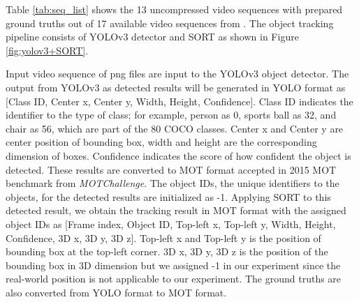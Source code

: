 Table \ref{tab:seq_list} shows the 13 uncompressed video sequences with prepared ground truths out of 17 available video sequences from \cite{choi_vcm_2020}. The object tracking pipeline consists of YOLOv3 detector and SORT as shown in Figure \ref{fig:yolov3+SORT}. 

Input video sequence of png files are input to the YOLOv3 object detector. The output from YOLOv3 as detected results will be generated in YOLO format as [Class ID, Center x, Center y, Width, Height, Confidence]. Class ID indicates the identifier to the type of class; for example, person as 0, sports ball as 32, and chair as 56, which are part of the 80 COCO classes. Center x and Center y are center position of bounding box, width and height are the corresponding dimension of boxes. Confidence indicates the score of how confident the object is detected. These results are converted to MOT format accepted in 2015 MOT benchmark from \textit{MOTChallenge}. The object IDs, the unique identifiers to the objects, for the detected results are initialized as -1. Applying SORT to this detected result, we obtain the tracking result in MOT format with the assigned object IDs as [Frame index, Object ID, Top-left x, Top-left y, Width, Height, Confidence, 3D x, 3D y, 3D z]. Top-left x and Top-left y is the position of bounding box at the top-left corner. 3D x, 3D y, 3D z is the position of the bounding box in 3D dimension but we assigned -1 in our experiment since the real-world position is not applicable to our experiment. The ground truths are also converted from YOLO format to MOT format.



